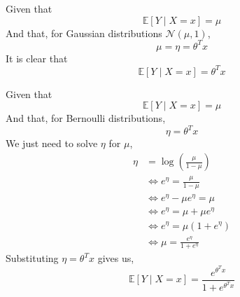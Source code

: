 \documentclass[12pt,twoside]{article}
\begin{document}
\begin{problems}
\begin{problemparts}
Given that
$$ \mathbb{E}\left[Y \mid X = x\right] = \mu $$
And that, for Gaussian distributions $\mathcal{N}(\mu, 1)$,
$$ \mu = \eta = \theta^T x $$
It is clear that
$$ \mathbb{E}\left[Y \mid X = x \right] = \theta^T x $$

\problempart %

Given that
$$ \mathbb{E}\left[Y \mid X = x\right] = \mu $$
And that, for Bernoulli distributions,
$$ \eta = \theta^T x $$
We just need to solve $\eta$ for $\mu$,
\begin{align*}
    \eta &= \log \left(\frac{\mu}{1 - \mu}\right) \\
    &\iff e^\eta = \frac{\mu}{1 - \mu} \\
    &\iff e^\eta - \mu e^\eta = \mu \\
    &\iff e^\eta = \mu + \mu e^\eta \\
    &\iff e^\eta = \mu \left(1 + e^\eta\right) \\
    &\iff \mu = \frac{e^\eta}{1 + e^\eta}
\end{align*}
Substituting $\eta = \theta^T x$ gives us,
$$ \mathbb{E}\left[Y \mid X = x\right] = \frac{e^{\theta^T x}}{1 +
e^{\theta^T x}} $$

\end{problemparts}

\end{problems}
\end{document}
